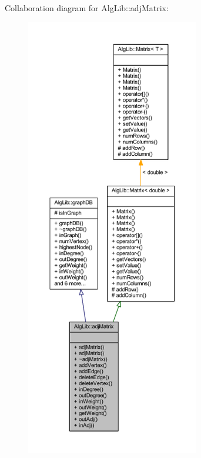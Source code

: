 Collaboration diagram for Alg\+Lib\+:\+:adj\+Matrix\+:\nopagebreak
\begin{figure}[H]
\begin{center}
\leavevmode
\includegraphics[height=550pt]{class_alg_lib_1_1adj_matrix__coll__graph}
\end{center}
\end{figure}
